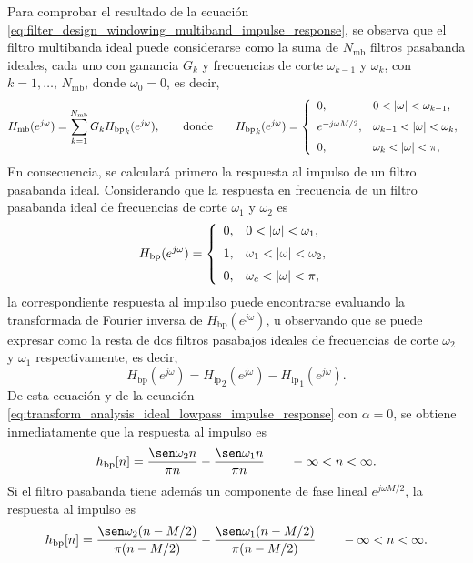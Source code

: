 \documentclass[a4paper]{report}
\begin{document}
Para comprobar el resultado de la ecuación \ref{eq:filter_design_windowing_multiband_impulse_response}, se observa que el filtro multibanda ideal puede considerarse como la suma de \(N_\textrm{mb}\) filtros pasabanda ideales, cada uno con ganancia \(G_k\) y frecuencias de corte \(\omega_{k-1}\) y \(\omega_{k}\), con \(k=1,\dots,\,N_\textrm{mb}\), donde \(\omega_0=0\), es decir,
\begin{equation}\label{eq:filter_design_windowing_multiband_freq_response_as_sum_passband}
 H_\textrm{mb}(e^{j\omega})=\sum_{k=1}^{N_\textrm{mb}}G_k{H_\textrm{bp}}_k(e^{j\omega}),
 \qquad\textrm{donde}\qquad
 {H_\textrm{bp}}_k(e^{j\omega})=
 \left\{
 \begin{array}{ll}
  0, & 0<|\omega|<\omega_{k-1},\\[\medskipamount]
  e^{-j\omega M/2}, & \omega_{k-1}<|\omega|<\omega_k, \\[\medskipamount]
  0, & \omega_k<|\omega|<\pi,\\
 \end{array}
 \right.  
\end{equation}
En consecuencia, se calculará primero la respuesta al impulso de un filtro pasabanda ideal. Considerando que la respuesta en frecuencia de un filtro pasabanda ideal de frecuencias de corte \(\omega_1\) y \(\omega_2\) es
\[
 H_\textrm{bp}(e^{j\omega})=
 \left\{
 \begin{array}{ll}
  0, & 0<|\omega|<\omega_1,\\[\medskipamount]
  1, & \omega_1<|\omega|<\omega_2, \\[\medskipamount]
  0, & \omega_c<|\omega|<\pi,\\
 \end{array}
 \right. 
\]
la correspondiente respuesta al impulso puede encontrarse evaluando la transformada de Fourier inversa de \(H_\textrm{bp}(e^{j\omega})\), u observando que se puede expresar como la resta de dos filtros pasabajos ideales de frecuencias de corte \(\omega_2\) y \(\omega_1\) respectivamente, es decir,
\[
 H_\textrm{bp}(e^{j\omega})={H_\textrm{lp}}_2(e^{j\omega})-{H_\textrm{lp}}_1(e^{j\omega}).
\]
De esta ecuación y de la ecuación \ref{eq:transform_analysis_ideal_lowpass_impulse_response} con \(\alpha=0\), se obtiene inmediatamente que la respuesta al impulso es
\[
 h_\textrm{bp}[n]=\frac{\sen\omega_2n}{\pi n}-\frac{\sen\omega_1n}{\pi n}
 \qquad
 -\infty<n<\infty.
\]
Si el filtro pasabanda tiene además un componente de fase lineal \(e^{j\omega M/2}\), la respuesta al impulso es
\[
 h_\textrm{bp}[n]=\frac{\sen\omega_2(n-M/2)}{\pi(n-M/2)}-\frac{\sen\omega_1(n-M/2)}{\pi(n-M/2)}
 \qquad
 -\infty<n<\infty.
\]
\end{document}
